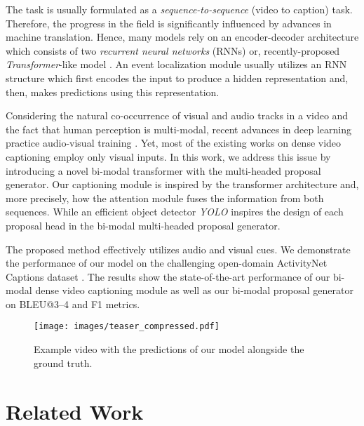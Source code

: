 \documentclass{src/bmvc2k}
\begin{document}
The task is usually formulated as a \textit{sequence-to-sequence} (video to caption) task. Therefore, the progress in the field is significantly influenced by advances in machine translation. Hence, many models rely on an encoder-decoder architecture which consists of two \textit{recurrent neural networks} (RNNs) or, recently-proposed \textit{Transformer}-like model \cite{transformer_Vaswani2017}. An event localization module usually utilizes an RNN structure which first encodes the input to produce a hidden representation and, then, makes predictions using this representation.

Considering the natural co-occurrence of visual and audio tracks in a video and the fact that human perception is multi-modal, recent advances in deep learning practice audio-visual training \cite{AV_Scene_Owens_2018,TheSoundPixels_Zhao_2018,AttentionClusters_Long_2018,VisGrounded_Zhu_2020,Separating_Zhu_2020}. Yet, most of the existing works on dense video captioning employ only visual inputs. In this work, we address this issue by introducing a novel bi-modal transformer with the multi-headed proposal generator. Our captioning module is inspired by the transformer architecture and, more precisely, how the attention module fuses the information from both sequences. While an efficient object detector \textit{YOLO} \cite{YOLOv3_Redmon_2018} inspires the design of each proposal head in the bi-modal multi-headed proposal generator.

The proposed method effectively utilizes audio and visual cues. We demonstrate the performance of our model on the challenging open-domain ActivityNet Captions dataset \cite{Krishna2017}. The results show the state-of-the-art performance of our bi-modal dense video captioning module as well as our bi-modal proposal generator on BLEU@3--4 and F1 metrics.


\begin{figure}
\begin{center}
\texttt{[image: images/teaser\_compressed.pdf]}
\end{center}
\vspace{-1em}
\caption{Example video with the predictions of our model alongside the ground truth. \label{fig:teaser}}
\end{figure}



\section{Related Work}
\end{document}
